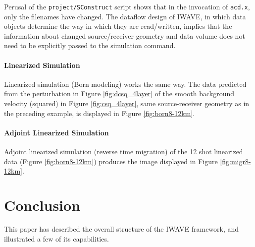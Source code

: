 {Perusal of the {\tt project/SConstruct} script shows that in the
invocation of {\tt acd.x}, only the filenames have changed. The
dataflow design of IWAVE, in which data objects determine the way in
which they are read/written, implies that the information about
changed source/receiver geometry and data volume does not need to be
explicitly passed to the simulation command.

\noindent \paragraph{Linearized Simulation}
Linearized simulation (Born modeling) works the same way. The data
predicted from the perturbation in Figure \ref{fig:dcsq_4layer} of the smooth
background velocity (squared) in Figure \ref{fig:csq_4layer}, same
source-receiver geometry as in the preceding example, is displayed in
Figure \ref{fig:born8-12km}.


\noindent \paragraph{Adjoint Linearized Simulation}
Adjoint linearized simulation (reverse time migration) of the 12 shot
linearized data (Figure \ref{fig:born8-12km}) produces the image
displayed in Figure \ref{fig:migr8-12km}. 


\section{Conclusion}
This paper has described the overall structure of the IWAVE framework,
and illustrated a few of its capabilities. 

}
